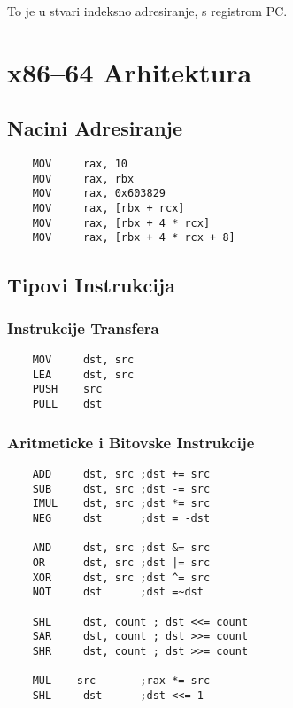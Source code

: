 \documentclass[12p,a4paper]{article}
\begin{document}
\begin{multicols}{2}
    To je u stvari indeksno adresiranje, s registrom PC.\

    \section{x86--64 Arhitektura}

    \subsection{Nacini Adresiranje}

    \begin{lstlisting}
    MOV     rax, 10        
    MOV     rax, rbx        
    MOV     rax, 0x603829   
    MOV     rax, [rbx + rcx]
    MOV     rax, [rbx + 4 * rcx]
    MOV     rax, [rbx + 4 * rcx + 8]
    \end{lstlisting}

    \subsection{Tipovi Instrukcija}

    \subsubsection{Instrukcije Transfera}

    \begin{lstlisting}
    MOV     dst, src
    LEA     dst, src
    PUSH    src
    PULL    dst
    \end{lstlisting}

    \subsubsection{Aritmeticke i Bitovske Instrukcije}

    \begin{lstlisting}
    ADD     dst, src ;dst += src
    SUB     dst, src ;dst -= src
    IMUL    dst, src ;dst *= src
    NEG     dst      ;dst = -dst

    AND     dst, src ;dst &= src
    OR      dst, src ;dst |= src
    XOR     dst, src ;dst ^= src
    NOT     dst      ;dst =~dst

    SHL     dst, count ; dst <<= count
    SAR     dst, count ; dst >>= count
    SHR     dst, count ; dst >>= count

    MUL    src       ;rax *= src
    SHL     dst      ;dst <<= 1
    \end{lstlisting}


\end{multicols}
\end{document}
